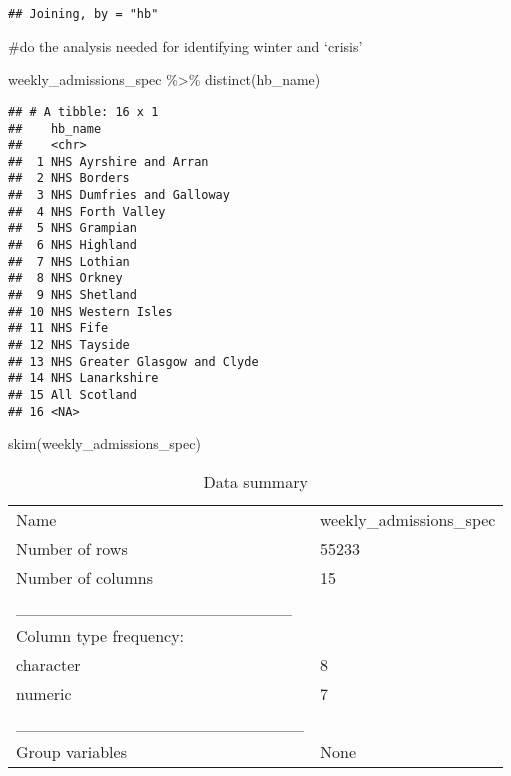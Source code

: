\documentclass[
]{article}
\newenvironment{Shaded}{\begin{snugshade}}{\end{snugshade}}
\newcommand{\FunctionTok}[1]{\textcolor[rgb]{0.00,0.00,0.00}{#1}}
\newcommand{\NormalTok}[1]{#1}
\newcommand{\SpecialCharTok}[1]{\textcolor[rgb]{0.00,0.00,0.00}{#1}}
\begin{document}
\begin{verbatim}
## Joining, by = "hb"
\end{verbatim}

\#do the analysis needed for identifying winter and `crisis'

\begin{Shaded}
\begin{Highlighting}[]
\NormalTok{weekly\_admissions\_spec }\SpecialCharTok{\%\textgreater{}\%} 
  \FunctionTok{distinct}\NormalTok{(hb\_name)}
\end{Highlighting}
\end{Shaded}

\begin{verbatim}
## # A tibble: 16 x 1
##    hb_name                      
##    <chr>                        
##  1 NHS Ayrshire and Arran       
##  2 NHS Borders                  
##  3 NHS Dumfries and Galloway    
##  4 NHS Forth Valley             
##  5 NHS Grampian                 
##  6 NHS Highland                 
##  7 NHS Lothian                  
##  8 NHS Orkney                   
##  9 NHS Shetland                 
## 10 NHS Western Isles            
## 11 NHS Fife                     
## 12 NHS Tayside                  
## 13 NHS Greater Glasgow and Clyde
## 14 NHS Lanarkshire              
## 15 All Scotland                 
## 16 <NA>
\end{verbatim}

\begin{Shaded}
\begin{Highlighting}[]
\FunctionTok{skim}\NormalTok{(weekly\_admissions\_spec)}
\end{Highlighting}
\end{Shaded}

\begin{longtable}[]{@{}ll@{}}
\caption{Data summary}\tabularnewline
\toprule()
\endhead
Name & weekly\_admissions\_spec \\
Number of rows & 55233 \\
Number of columns & 15 \\
\_\_\_\_\_\_\_\_\_\_\_\_\_\_\_\_\_\_\_\_\_\_\_ & \\
Column type frequency: & \\
character & 8 \\
numeric & 7 \\
\_\_\_\_\_\_\_\_\_\_\_\_\_\_\_\_\_\_\_\_\_\_\_\_ & \\
Group variables & None \\
\bottomrule()
\end{longtable}
\end{document}
